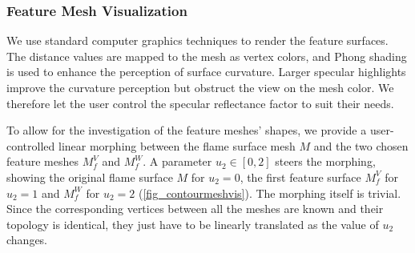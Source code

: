 \subsubsection{Feature Mesh Visualization}
%
We use standard computer graphics techniques to render the feature surfaces.
%
The distance values are mapped to the mesh as vertex colors, and Phong shading
is used to enhance the perception of surface curvature.
%
Larger specular highlights improve the curvature perception but obstruct the
view on the mesh color. We therefore let the user control the specular
reflectance factor to suit their needs.
%

%
To allow for the investigation of the feature meshes' shapes, we provide a
user-controlled linear morphing between the flame surface mesh $M$ and the two
chosen feature meshes $M^{V}_{f}$ and $M^{W}_{f}$.
%
A parameter $u_2 \in [0, 2]$ steers the morphing, showing the original flame
surface $M$ for $u_2 = 0$, the first feature surface $M^{V}_{f}$ for $u_2 = 1$
and $M^{W}_{f}$ for $u_2 = 2$ (\cref{fig_contourmeshvis}).
%
The morphing itself is trivial.
%
Since the corresponding vertices between all the meshes are known
and their topology is identical, they just have to be linearly translated as the
value of $u_2$ changes.
%

